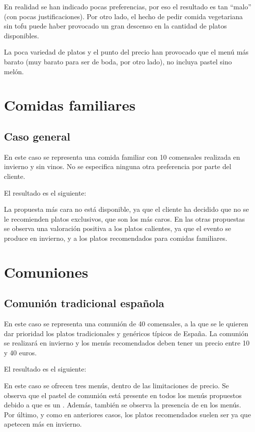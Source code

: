 En realidad se han indicado pocas preferencias, por eso el resultado es tan
``malo'' (con pocas justificaciones). Por otro lado, el hecho de pedir comida
vegetariana sin tofu puede haber provocado un gran descenso en la cantidad de
platos disponibles.

La poca variedad de platos y el punto del precio han provocado que el menú más
barato (muy barato para ser de boda, por otro lado), no incluya pastel sino
melón.

\section{Comidas familiares}
\subsection{Caso general}
En este caso se representa una comida familiar con 10 comensales realizada en invierno y sin vinos. No se especifica ninguna otra
preferencia por parte del cliente.

El resultado es el siguiente:


La propuesta más cara no está disponible, ya que el cliente ha decidido que no se le recomienden platos exclusivos, que son los más
caros. En las otras propuestas se observa una valoración positiva a los platos calientes, ya que el evento se produce en invierno,
y a los platos recomendados para comidas familiares.

\section{Comuniones}
\subsection{Comunión tradicional española}
En este caso se representa una comunión de 40 comensales, a la que se le quieren dar prioridad los platos tradicionales y genéricos
típicos de España. La comunión se realizará en invierno y los menús recomendados deben tener un precio entre 10 y 40 euros.

El resultado es el siguiente:


En este caso se ofrecen tres menús, dentro de las limitaciones de precio. Se observa que el pastel de comunión está presente en
todos los menús propuestos debido a que es un . Además, también se observa la presencia de
 en  los menús. Por último, y como en anteriores casos, los platos
recomendados suelen ser  ya que apetecen más en invierno.
